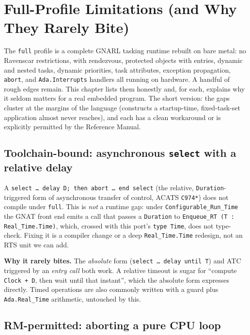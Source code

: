 \chapter{Full-Profile Limitations (and Why They Rarely Bite)}

The \texttt{full} profile is a complete GNARL tasking runtime rebuilt on bare
metal: no Ravenscar restrictions, with rendezvous, protected objects with
entries, dynamic and nested tasks, dynamic priorities, task attributes,
exception propagation, \texttt{abort}, and \texttt{Ada.Interrupts} handlers all
running on hardware. A handful of rough edges remain. This chapter lists them
honestly and, for each, explains why it seldom matters for a real embedded
program. The short version: the gaps cluster at the margins of the language
(constructs a startup-time, fixed-task-set application almost never reaches), and
each has a clean workaround or is explicitly permitted by the Reference Manual.

\section{Toolchain-bound: asynchronous \texttt{select} with a relative delay}

A \texttt{select \ldots\ delay D; then abort \ldots\ end select} (the relative,
\texttt{Duration}-triggered form of asynchronous transfer of control, ACATS
\texttt{C974*}) does not compile under \texttt{full}. This is \emph{not} a runtime
gap: under \texttt{Configurable\_Run\_Time} the GNAT front end emits a call that
passes a \texttt{Duration} to \texttt{Enqueue\_RT (T : Real\_Time.Time)}, which,
crossed with this port's \texttt{type Time}, does not type-check. Fixing it is a
compiler change or a deep \texttt{Real\_Time.Time} redesign, not an RTS unit we
can add.

\textbf{Why it rarely bites.} The \emph{absolute} form (\texttt{select \ldots\
delay until T}) and ATC triggered by an \emph{entry call} both work. A relative
timeout is sugar for ``compute \texttt{Clock + D}, then wait until that instant'',
which the absolute form expresses directly. Timed operations are also commonly
written with a guard plus \texttt{Ada.Real\_Time} arithmetic, untouched by this.

\section{RM-permitted: aborting a pure CPU loop}

